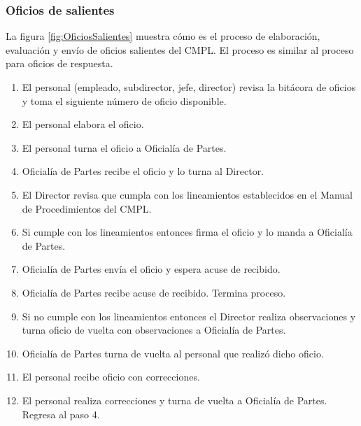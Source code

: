 	\subsubsection{Oficios de salientes}
	La figura \ref{fig:OficiosSalientes} muestra cómo es el proceso de elaboración, evaluación y envío de oficios salientes del CMPL. El proceso es similar al proceso para oficios de respuesta.
	
	\begin{enumerate}
		\item El personal (empleado, subdirector, jefe, director) revisa la bitácora de oficios y toma el siguiente número de oficio disponible.
		\item El personal elabora el oficio.
		\item El personal turna el oficio a Oficialía de Partes.
		\item Oficialía de Partes recibe el oficio y lo turna al Director.
		\item El Director revisa que cumpla con los lineamientos establecidos en el Manual de Procedimientos del CMPL.
		\item Si cumple con los lineamientos entonces firma el oficio y lo manda a Oficialía de Partes.
		\item Oficialía de Partes envía el oficio y espera acuse de recibido.
		\item Oficialía de Partes recibe acuse de recibido. Termina proceso.
		\item Si no cumple con los lineamientos entonces el Director realiza observaciones y turna oficio de vuelta con observaciones a Oficialía de Partes.
		\item Oficialía de Partes turna de vuelta al personal que realizó dicho oficio.
		\item El personal recibe oficio con correcciones.
		\item El personal realiza correcciones y turna de vuelta a Oficialía de Partes. Regresa al paso 4.
	\end{enumerate}
	
